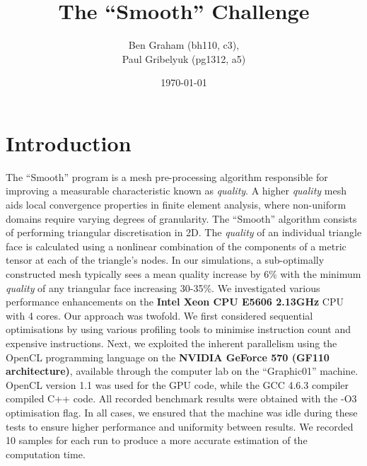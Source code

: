 \documentclass[a4paper,12pt, twocolumn]{article}
\author{
    Ben Graham (bh110, c3), \\
    Paul Gribelyuk (pg1312, a5)
}
\date{\today}
\title{The ``Smooth'' Challenge}
\begin{document}
\maketitle
\section{Introduction}
The ``Smooth'' program is a mesh pre-processing algorithm responsible for improving a measurable characteristic known as \emph{quality}.
A higher \emph{quality} mesh aids local convergence properties in finite element analysis, where non-uniform domains require varying degrees of granularity.
The ``Smooth'' algorithm consists of performing triangular discretisation in 2D.
The \emph{quality} of an individual triangle face is calculated using a nonlinear combination of the components of a metric tensor at each of the triangle's nodes.
In our simulations, a sub-optimally constructed mesh typically sees a mean quality increase by 6\% with the minimum \emph{quality} of any triangular face increasing 30-35\%.
We investigated various performance enhancements on the \textbf{Intel Xeon CPU E5606 2.13GHz} CPU with 4 cores.
Our approach was twofold.
We first considered sequential optimisations by using various profiling tools to minimise instruction count and expensive instructions.
Next, we exploited the inherent parallelism using the OpenCL programming language on the \textbf{NVIDIA GeForce 570 (GF110 architecture)}, available through the computer lab on the ``Graphic01'' machine.
OpenCL version 1.1 was used for the GPU code, while the GCC 4.6.3 compiler compiled C++ code.
All recorded benchmark results were obtained with the -O3 optimisation flag.
In all cases, we ensured that the machine was idle during these tests to ensure higher performance and uniformity between results.
We recorded 10 samples for each run to produce a more accurate estimation of the computation time.
\end{document}
